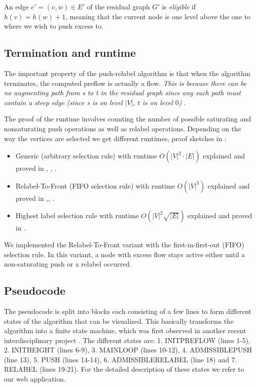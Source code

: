 \begin{definition} %
An edge $e'=(v,w) \in E'$ of the residual graph $G'$ is \textit{eligible} if $h(v)=h(w)+1$, meaning that the current node is one level above the one to where we wish to push excess to.
\end{definition}

\subsection{Termination and runtime}
The important property of the push-relabel algorithm is that when the algorithm terminates, the computed preflow is actually a flow. \textit{This is because there can be no augmenting path from s to t in the residual graph since any such path must contain a steep edge (since s is on level $|V|$, $t$ is on level $0$)} \cite{mehlhorn2000maximum}.

The proof of the runtime involves counting the number of possible saturating and nonsaturating push operations as well as relabel operations. Depending on the way the vertices are selected we get different runtimes, proof sketches in \cite{mehlhorn2000maximum,williamson2007network,matuschke2016network}:
\begin{itemize}
	\item Generic (arbitrary selection rule) with runtime $O(|V|^2 \cdot |E|)$ explained and proved in \cite[sec. 7.6]{ahuja1993network}, \cite[sec. 26.4]{cormen2009introduction}, \cite[alg. 6.6.1]{jungnickel2013graphs}. 
	\item Relabel-To-Front (FIFO selection rule) with runtime $O(|V|^3)$ explained and proved in \cite[sec. 7.7]{ahuja1993network},\cite[sec. 26.5]{cormen2009introduction}, \cite[alg. 6.6.14]{jungnickel2013graphs}.
	\item Highest label selection rule with runtime $O(|V|^2\sqrt{|E|})$ explained and proved in \cite[sec. 7.8]{ahuja1993network} \cite[alg. 6.6.16]{jungnickel2013graphs}.
\end{itemize}

We implemented the Relabel-To-Front variant with the first-in-first-out (FIFO) selection rule. In this variant, a node with excess flow stays active either until a non-saturating push or a relabel occurred. 

\clearpage
\subsection{Pseudocode}

The pseudocode is split into blocks each consisting of a few lines to form different states of the algorithm that can be visualized. This basically transforms the algorithm into a finite state machine, which was first observed in another recent interdisciplinary project \cite{feil2016idp}. The different states are: 1. INITPREFLOW (lines 1-5), 2. INITHEIGHT (lines 6-9), 3. MAINLOOP (lines 10-12), 4. ADMISSIBLEPUSH (line 13), 5. PUSH (lines 14-14), 6. ADMISSIBLERELABEL (line 18) and 7. RELABEL (lines 19-21). For the detailed description of these states we refer to our web application.

